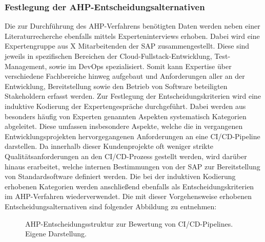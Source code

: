 \subsubsection{Festlegung der AHP-Entscheidungsalternativen}
 Die zur Durchführung des AHP-Verfahrens benötigten Daten werden neben einer Literaturrecherche ebenfalls mittels Experteninterviews erhoben. Dabei wird eine Expertengruppe aus X Mitarbeitenden der SAP zusammengestellt. Diese sind jeweils in spezifischen Bereichen der Cloud-Fullstack-Entwicklung, Test-Management, sowie im DevOps spezialisiert. Somit kann Expertise über verschiedene Fachbereiche hinweg aufgebaut und Anforderungen aller an der Entwicklung, Bereitstellung sowie den Betrieb von Software beteiligten Stakeholdern erfasst werden. Zur Festlegung der Entscheidungskriterien wird eine induktive Kodierung der Expertengespräche durchgeführt. Dabei werden aus besonders häufig von Experten genannten Aspekten systematisch Kategorien abgeleitet. Diese umfassen insbesondere Aspekte, welche die in vergangenen Entwicklungsprojekten hervorgegangenen Anforderungen an eine CI/CD-Pipeline darstellen. Da innerhalb dieser Kundenprojekte oft weniger strikte Qualitätsanforderungen an den CI/CD-Prozess gestellt werden, wird darüber hinaus erarbeitet, welche internen Bestimmungen von der SAP zur Bereitstellung von Standardsoftware definiert werden. Die bei der induktiven Kodierung erhobenen Kategorien werden anschließend ebenfalls als Entscheidungskriterien im AHP-Verfahren wiederverwendet. Die mit dieser Vorgehensweise erhobenen Entscheidungsalternativen sind folgender Abbildung zu entnehmen:
 \begin{center}
	\begin{figure}[H]
		\centering
		\caption[AHP-Entscheidungsstruktur zur Bewertung von CI/CD-Pipelines]{AHP-Entscheidungsstruktur zur Bewertung von CI/CD-Pipelines. Eigene Darstellung.}
		\label{fig:AHP_E}
	\end{figure}
\end{center}
\vspace*{-10mm}
